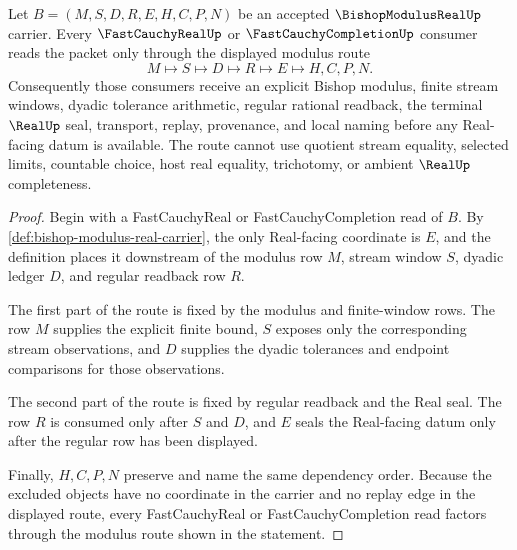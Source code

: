 \begin{theorem}
\label{thm:bishop-modulus-real-fast-cauchy-handoff}
Let $B=(M,S,D,R,E,H,C,P,N)$ be an accepted $\BishopModulusRealUp$ carrier. Every $\FastCauchyRealUp$ or $\FastCauchyCompletionUp$ consumer reads the packet only through the displayed modulus route
$$
M \longmapsto S \longmapsto D \longmapsto R \longmapsto E \longmapsto H,C,P,N .
$$
Consequently those consumers receive an explicit Bishop modulus, finite stream windows, dyadic tolerance arithmetic, regular rational readback, the terminal $\RealUp$ seal, transport, replay, provenance, and local naming before any Real-facing datum is available. The route cannot use quotient stream equality, selected limits, countable choice, host real equality, trichotomy, or ambient $\RealUp$ completeness.
\end{theorem}
\begin{proof}
Begin with a FastCauchyReal or FastCauchyCompletion read of $B$. By \autoref{def:bishop-modulus-real-carrier}, the only Real-facing coordinate is $E$, and the definition places it downstream of the modulus row $M$, stream window $S$, dyadic ledger $D$, and regular readback row $R$.

The first part of the route is fixed by the modulus and finite-window rows. The row $M$ supplies the explicit finite bound, $S$ exposes only the corresponding stream observations, and $D$ supplies the dyadic tolerances and endpoint comparisons for those observations.

The second part of the route is fixed by regular readback and the Real seal. The row $R$ is consumed only after $S$ and $D$, and $E$ seals the Real-facing datum only after the regular row has been displayed.

Finally, $H,C,P,N$ preserve and name the same dependency order. Because the excluded objects have no coordinate in the carrier and no replay edge in the displayed route, every FastCauchyReal or FastCauchyCompletion read factors through the modulus route shown in the statement.
\end{proof}


